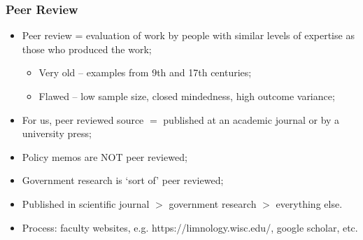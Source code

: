 \documentclass[aspectratio=169]{beamer}
\theoremstyle{principle}
\begin{document}
\begin{frame}
\frametitle{Peer Review}

\begin{itemize}

\item Peer review = evaluation of work by people with similar levels of expertise as those who produced the work;
\begin{itemize}
\item Very old -- examples from 9th and 17th centuries;
\item Flawed -- low sample size, closed mindedness, high outcome variance;
\end{itemize}
\bigskip
\item For us, peer reviewed source $=$ published at an academic journal or by a university press;
\bigskip
\item Policy memos are NOT peer reviewed;
\bigskip
\item Government research is `sort of' peer reviewed;
\bigskip
\item Published in scientific journal $>$ government research $>$ everything else.
\bigskip
\item Process: faculty websites, e.g. https://limnology.wisc.edu/, google scholar, etc.
\end{itemize}

\end{frame}
\end{document}
